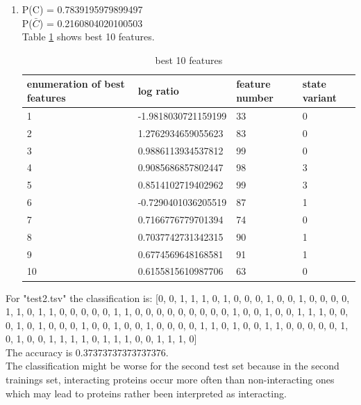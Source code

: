 \documentclass[10pt,a4paper]{article}
\begin{document}
\begin{enumerate}
\item P(C) = 0.7839195979899497\\
P($\bar{C}$) = 0.2160804020100503\\
Table \ref{tab2} shows best 10 features.\\
\begin{table}[b]
\label{tab2}
\begin{tabular}{llll}
enumeration of best features & log ratio & feature number & state variant\\
\hline
1 & -1.9818030721159199 & 33 & 0\\
2 & 1.2762934659055623 & 83 & 0\\
3 & 0.9886113934537812 & 99 & 0\\
4 & 0.9085686857802447 & 98 & 3\\
5 & 0.8514102719402962 & 99 & 3\\
6 & -0.7290401036205519 & 87 & 1\\
7 & 0.7166776779701394 & 74 & 0\\
8 & 0.7037742731342315 & 90 & 1\\
9 & 0.6774569648168581 & 91 & 1\\
10 & 0.6155815610987706 & 63 & 0\\
\end{tabular}
\caption{best 10 features}
\end{table}
\end{enumerate}
For "test2.tsv" the classification is: [0, 0, 1, 1, 1, 0, 1, 0, 0, 0, 1, 0, 0, 1, 0, 0, 0, 0, 1, 1, 0, 1, 1, 0, 0, 0, 0, 0, 1, 1, 0, 0, 0, 0, 0, 0, 0, 0, 0, 1, 0, 0, 1, 0, 0, 1, 1, 1, 0, 0, 0, 1, 0, 1, 0, 0, 0, 1, 0, 0, 1, 0, 0, 1, 0, 0, 0, 0, 1, 1, 0, 1, 0, 0, 1, 1, 0, 0, 0, 0, 0, 1, 0, 1, 0, 0, 1, 1, 1, 1, 0, 1, 1, 1, 0, 0, 1, 1, 1, 0]\\
The accuracy is 0.37373737373737376.\\
The classification might be worse for the second test set because in the second trainings set, interacting proteins occur more often than non-interacting ones which may lead to proteins rather been interpreted as interacting.
\end{document}
